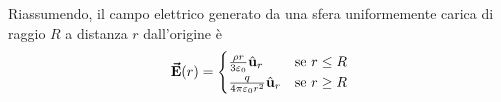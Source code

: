 Riassumendo, il campo elettrico generato da una sfera uniformemente carica di raggio $R$ a distanza $r$ dall'origine è
\begin{equation}
	\vb*{\va{E}}(r)=\begin{cases}
		\frac{\rho r}{3\varepsilon_0}\hat{\mathbf{u}}_r&\text{se}\ r\leq R\\
		\frac{q}{4\pi\varepsilon_0 r^2}\hat{\mathbf{u}}_r &\text{se}\ r\geq R
	\end{cases}
\end{equation}